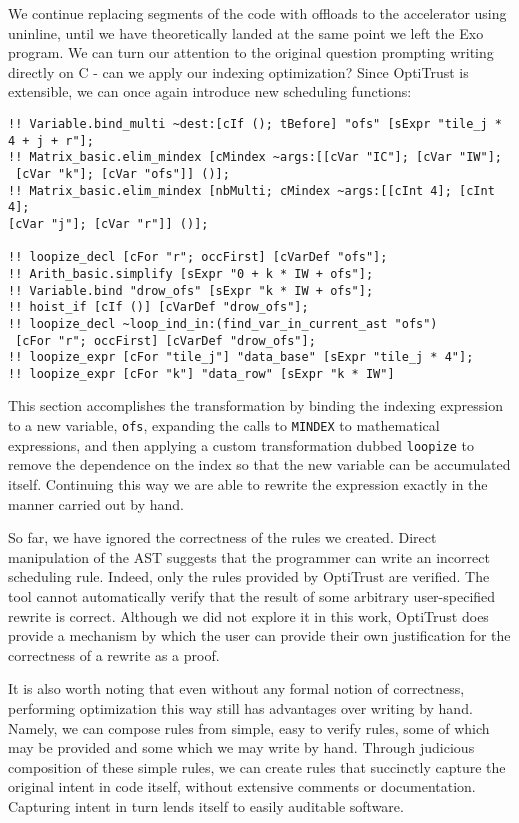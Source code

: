 \documentclass[acmsmall, nonacm=true]{acmart}
\begin{document}
We continue replacing segments of the code with offloads to the accelerator using uninline, until we have theoretically landed at the same point we left the Exo program. We can turn our attention to the original question prompting writing directly on C - can we apply our indexing optimization? Since OptiTrust is extensible, we can once again introduce new scheduling functions:

\begin{verbatim}
!! Variable.bind_multi ~dest:[cIf (); tBefore] "ofs" [sExpr "tile_j * 4 + j + r"];
!! Matrix_basic.elim_mindex [cMindex ~args:[[cVar "IC"]; [cVar "IW"];
 [cVar "k"]; [cVar "ofs"]] ()];
!! Matrix_basic.elim_mindex [nbMulti; cMindex ~args:[[cInt 4]; [cInt 4];
[cVar "j"]; [cVar "r"]] ()];

!! loopize_decl [cFor "r"; occFirst] [cVarDef "ofs"];
!! Arith_basic.simplify [sExpr "0 + k * IW + ofs"];
!! Variable.bind "drow_ofs" [sExpr "k * IW + ofs"];
!! hoist_if [cIf ()] [cVarDef "drow_ofs"];
!! loopize_decl ~loop_ind_in:(find_var_in_current_ast "ofs")
 [cFor "r"; occFirst] [cVarDef "drow_ofs"];
!! loopize_expr [cFor "tile_j"] "data_base" [sExpr "tile_j * 4"];
!! loopize_expr [cFor "k"] "data_row" [sExpr "k * IW"]
\end{verbatim}

This section accomplishes the transformation by binding the indexing expression to a new variable, \verb|ofs|, expanding the calls to \verb|MINDEX| to mathematical expressions, and then applying a custom transformation dubbed \verb|loopize| to remove the dependence on the index so that the new variable can be accumulated itself. Continuing this way we are able to rewrite the expression exactly in the manner carried out by hand.

So far, we have ignored the correctness of the rules we created. Direct manipulation of the AST suggests that the programmer can write an incorrect scheduling rule. Indeed, only the rules provided by OptiTrust are verified. The tool cannot automatically verify that the result of some arbitrary user-specified rewrite is correct. Although we did not explore it in this work, OptiTrust does provide a mechanism by which the user can provide their own justification for the correctness of a rewrite as a proof.

It is also worth noting that even without any formal notion of correctness, performing optimization this way still has advantages over writing by hand. Namely, we can compose rules from simple, easy to verify rules, some of which may be provided and some which we may write by hand. Through judicious composition of these simple rules, we can create rules that succinctly capture the original intent in code itself, without extensive comments or documentation. Capturing intent in turn lends itself to easily auditable software.
\end{document}
